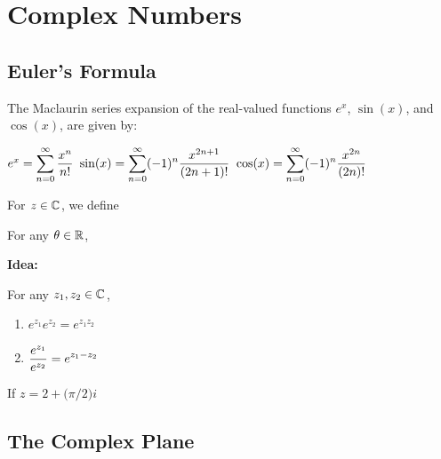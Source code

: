 \documentclass[11pt,fleqn,dvipsnames,usenames]{article}
\renewcommand{\headrulewidth}{1pt}
\newcommand{\p}{\noindent}
\begin{document}
\fancyhead[L]{\course}
\fancyhead[R]{\term}
\renewcommand{\headrulewidth}{0.4pt}


\setcounter{section}{1}
\section{Complex Numbers}
\setcounter{subsection}{1}
\subsection{Euler's Formula}

\recall The Maclaurin series expansion of the real-valued functions $e^{x}$, $\sin(x)$, and $\cos(x)$, are given by:
\begin{center}
$e^{x} = \displaystyle\sum\limits_{n=0}^{\infty}\frac{x^{n}}{n!}$\hspace{2cm}
$\sin(x) = \displaystyle\sum\limits_{n=0}^{\infty}(-1)^{n}\frac{x^{2n+1}}{(2n+1)!}$\hspace{2cm}
$\cos(x) = \displaystyle\sum\limits_{n=0}^{\infty}(-1)^{n}\frac{x^{2n}}{(2n)!}$
\end{center}
\vsp

For $z\in\mathbb{C}$, we define
\vspace{2cm}

 For any $\theta\in\mathbb{R}$,
\vsp

\p\textbf{Idea:}
\vfill

\properties For any $z_{1},z_{2}\in\mathbb{C}$,
\begin{multicols}{2}
\begin{enumerate}[(1)]
\item $e^{z_{1}}e^{z_{2}} = e^{z_{1}z_{2}}$
\item $\displaystyle{\frac{e^{z_{1}}}{e^{z_{2}}} = e^{z_{1} - z_{2}}}$
\end{enumerate}
\end{multicols}
\vsp

\begin{example*} If $z = 2 + \big(\pi/2\big)i$
\end{example*}
\newpage



\subsection{The Complex Plane}
\end{document}
